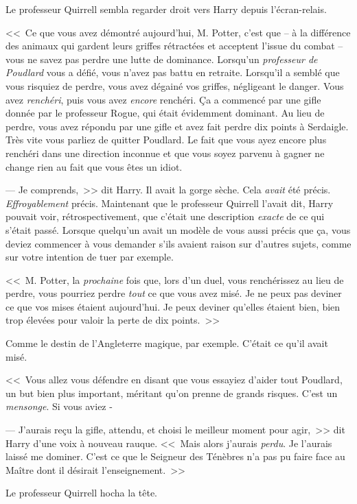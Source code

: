Le professeur Quirrell sembla regarder droit vers Harry depuis l'écran-relais.

<<~Ce que vous avez démontré aujourd'hui, M. Potter, c'est que -- à la différence des animaux qui gardent leurs griffes rétractées et acceptent l'issue du combat -- vous ne savez pas perdre une lutte de dominance. Lorsqu'un \emph{professeur de Poudlard} vous a défié, vous n'avez pas battu en retraite. Lorsqu'il a semblé que vous risquiez de perdre, vous avez dégainé vos griffes, négligeant le danger. Vous avez \emph{renchéri}, puis vous avez \emph{encore} renchéri. Ça a commencé par une gifle donnée par le professeur Rogue, qui était évidemment dominant. Au lieu de perdre, vous avez répondu par une gifle et avez fait perdre dix points à Serdaigle. Très vite vous parliez de quitter Poudlard. Le fait que vous ayez encore plus renchéri dans une direction inconnue et que vous soyez parvenu à gagner ne change rien au fait que vous êtes un idiot.

--- Je comprends,~>> dit Harry. Il avait la gorge sèche. Cela \emph{avait} été précis. \emph{Effroyablement} précis. Maintenant que le professeur Quirrell l'avait dit, Harry pouvait voir, rétrospectivement, que c'était une description \emph{exacte} de ce qui s'était passé. Lorsque quelqu'un avait un modèle de vous aussi précis que ça, vous deviez commencer à vous demander s'ils avaient raison sur d'autres sujets, comme sur votre intention de tuer par exemple.

<<~M. Potter, la \emph{prochaine} fois que, lors d'un duel, vous renchérissez au lieu de perdre, vous pourriez perdre \emph{tout} ce que vous avez misé. Je ne peux pas deviner ce que vos mises étaient aujourd'hui. Je peux deviner qu'elles étaient bien, bien trop élevées pour valoir la perte de dix points.~>>

Comme le destin de l'Angleterre magique, par exemple. C'était ce qu'il avait misé.

<<~Vous allez vous défendre en disant que vous essayiez d'aider tout Poudlard, un but bien plus important, méritant qu'on prenne de grands risques. C'est un \emph{mensonge}. Si vous aviez -

--- J'aurais reçu la gifle, attendu, et choisi le meilleur moment pour agir,~>> dit Harry d'une voix à nouveau rauque. <<~Mais alors j'aurais \emph{perdu}. Je l'aurais laissé me dominer. C'est ce que le Seigneur des Ténèbres n'a pas pu faire face au Maître dont il désirait l'enseignement.~>>

Le professeur Quirrell hocha la tête.

